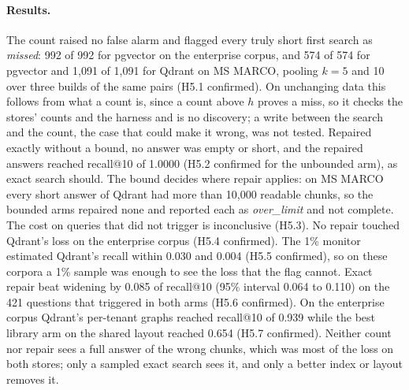 \paragraph{Results.}
The count raised no false alarm and flagged every truly short first search as \emph{missed}: 992 of 992 for pgvector on the
enterprise corpus, and 574 of 574 for pgvector and 1,091 of 1,091 for Qdrant on MS MARCO, pooling $k = 5$ and 10 over three builds of the same pairs (H5.1 confirmed).
On unchanging data this follows from what a count is, since a count above $h$ proves a miss, so it checks the stores' counts and the harness and is no discovery; a write between the search and
the count, the case that could make it wrong, was not tested. Repaired exactly
without a bound, no answer was empty or short, and the repaired answers reached recall@10 of 1.0000 (H5.2 confirmed for the
unbounded arm), as exact search should. The bound decides where repair applies: on MS MARCO every short answer of Qdrant had
more than 10,000 readable chunks, so the bounded arms repaired none and reported each as \emph{over\_limit} and not complete. The
cost on queries that did not trigger is inconclusive (H5.3). No repair touched Qdrant's loss on the enterprise corpus (H5.4 confirmed). The 1\% monitor estimated Qdrant's
recall within 0.030 and 0.004 (H5.5 confirmed), so on these corpora a 1\% sample was enough to see the loss that the flag cannot. Exact repair beat
widening by 0.085 of recall@10 (95\% interval 0.064 to 0.110) on the 421 questions that triggered in both arms (H5.6 confirmed).
On the enterprise corpus Qdrant's per-tenant graphs reached recall@10 of 0.939 while the best library arm on the shared layout
reached 0.654 (H5.7 confirmed). Neither count nor repair sees a full answer of the wrong chunks, which was most of the loss on both
stores; only a sampled exact search sees it, and only a better index or layout removes it.
